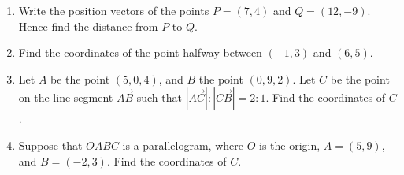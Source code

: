 \documentclass{article}
\let\rarrow\overrightarrow
\begin{document}
\begin{enumerate}
	\item Write the position vectors of the points $P=(7,4)$ and $Q=(12,-9)$. Hence find the distance from $P$ to $Q$.
	\item Find the coordinates of the point halfway between $(-1,3)$ and $(6,5)$.
	\item Let $A$ be the point $(5,0,4)$, and $B$ the point $(0,9,2)$. Let $C$ be the point on the line segment $\rarrow{AB}$ such that $|\rarrow{AC}|:|\rarrow{CB}|=2:1$. Find the coordinates of $C$.
	\item Suppose that $OABC$ is a parallelogram, where $O$ is the origin, $A=(5,9)$, and $B=(-2,3)$. Find the coordinates of $C$.
\end{enumerate}
\end{document}
